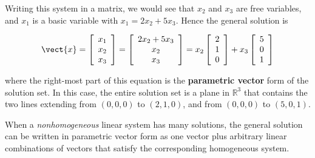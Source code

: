 \begin{solution}

Writing this system in a matrix, we would see that $x_2$ and $x_3$ are free variables, and $x_1$ is a basic variable with $x_1=2 x_2+5 x_3$. Hence the general solution is

$$
\vect{x}=\left[\begin{array}{l}
x_1 \\
x_2 \\
x_3
\end{array}\right]=\left[\begin{array}{c}
2 x_2+5 x_3 \\
x_2 \\
x_3
\end{array}\right]=x_2\left[\begin{array}{l}
2 \\
1 \\
0
\end{array}\right]+x_3\left[\begin{array}{l}
5 \\
0 \\
1
\end{array}\right]
$$

where the right-most part of this equation is the \textbf{parametric vector} form of the solution set. In this case, the entire solution set is a plane in $\mathbb{R}^3$ that contains the two lines extending from $(0,0,0)$ to $(2,1,0)$, and from $(0,0,0)$ to $(5,0,1)$.
\end{solution}

When a \textit{nonhomogeneous} linear system has many solutions, the general solution can be written in parametric vector form as one vector plus arbitrary linear combinations of vectors that satisfy the corresponding homogeneous system.


